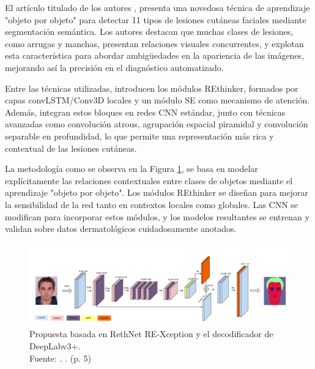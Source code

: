 
El artículo titulado  de los autores \cite{Bekmirzaev2021}, presenta una novedosa técnica de aprendizaje "objeto por objeto" para detectar 11 tipos de lesiones cutáneas faciales mediante segmentación semántica. Los autores destacan que muchas clases de lesiones, como arrugas y manchas, presentan relaciones visuales concurrentes, y explotan esta característica para abordar ambigüedades en la apariencia de las imágenes, mejorando así la precisión en el diagnóstico automatizado.  

Entre las técnicas utilizadas, introducen los módulos REthinker, formados por capas convLSTM/Conv3D locales y un módulo SE como mecanismo de atención. Además, integran estos bloques en redes CNN estándar, junto con técnicas avanzadas como convolución atrous, agrupación espacial piramidal y convolución separable en profundidad, lo que permite una representación más rica y contextual de las lesiones cutáneas.  

La metodología como se observa en la Figura \ref{2:fig7}, se basa en modelar explícitamente las relaciones contextuales entre clases de objetos mediante el aprendizaje "objeto por objeto". Los módulos REthinker se diseñan para mejorar la sensibilidad de la red tanto en contextos locales como globales. Las CNN se modifican para incorporar estos módulos, y los modelos resultantes se entrenan y validan sobre datos dermatológicos cuidadosamente anotados.  

\begin{figure}[!ht]
	\begin{center}
		\includegraphics[width=1\textwidth]{2/figures/propose7.png}
		\caption[Propuesta basada en RethNet RE-Xception y el decodificador de DeepLabv3+]{Propuesta basada en RethNet RE-Xception y el decodificador de DeepLabv3+.\\
			Fuente: \cite{Bekmirzaev2021}. . (p. 5)}
		\label{2:fig7}
	\end{center}
\end{figure}

